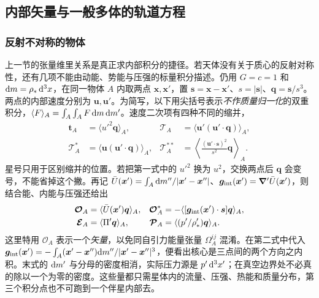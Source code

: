 \subsection{内部矢量与一般多体的轨道方程}

\subsubsection{反射不对称的物体}

上一节的张量维里关系是真正求内部积分的捷径。若天体没有关于质心的反射对称性，还有几项不能由动能、势能与压强的标量积分描述。仍用 $G=c=1$ 和 $\dd m=\rho_*\dd[3]{x}$，在同一物体 $A$ 内取两点 $\bm x,\bm x'$，置 $\bm s=\bm x-\bm x'$、$s=|\bm s|$、$\bm q=\bm s/s^3$。两点的内部速度分别为 $\bm u,\bm u'$。为简写，以下用尖括号表示\emph{不作质量归一化}的双重积分，$\langle F\rangle_A=\int_A\int_A F\,\dd m\,\dd m'$。速度二次项有四种不同的缩并，
\begin{align*}
 \bm t_A&=\langle u'^2\bm q\rangle_A,&
 \bm{\mathcal T}_A&=\langle\bm u'(\bm u'\cdot\bm q)\rangle_A,\\
 \bm{\mathcal T}_A^*&=\langle\bm u(\bm u'\cdot\bm q)\rangle_A,&
 \bm{\mathcal T}_A^{**}&=
       \left\langle\frac{(\bm u'\cdot\bm s)^2}{s^2}\bm q\right\rangle_A .
\end{align*}
星号只用于区别缩并的位置。若把第一式中的 $u'^2$ 换为 $u^2$，交换两点后 $\bm q$ 会变号，不能省掉这个撇。再记 $\bar U(\bm x')=\int_A\dd m''/|\bm x'-\bm x''|$、$\bm g_{\rm int}(\bm x')=\bm\nabla'\bar U(\bm x')$，则结合能、内能与压强还给出
\begin{align*}
 \bm{\mathcal O}_A&=\langle\bar U(\bm x')\bm q\rangle_A,&
 \bm{\mathcal O}_A^*&=-\langle[\bm g_{\rm int}(\bm x')\cdot\bm s]\bm q\rangle_A,\\
 \bm{\mathcal E}_A&=\langle\Pi'\bm q\rangle_A,&
 \bm{\mathcal P}_A&=\langle(p'/\rho_*')\bm q\rangle_A .
\end{align*}
这里特用 $\bm{\mathcal O}_A$ 表示一个\emph{矢量}，以免同自引力能量张量 $\Omega_A^{ij}$ 混淆。在第二式中代入 $\bm g_{\rm int}(\bm x')=-\int_A (\bm x'-\bm x'')\dd m''/|\bm x'-\bm x''|^3$，便看出核心是三点间的两个方向之内积。末式的 $\dd m'$ 与分母的密度相消，实际压力源是 $p'\dd[3]{x'}$；在真空边界处不必真的除以一个为零的密度。这些量都只需星体内的流量、压强、热能和质量分布，第三个积分点也不可跑到一个伴星内部去。

